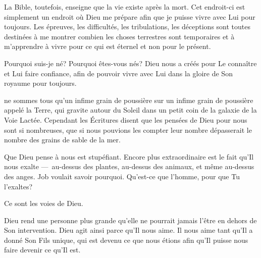 La Bible, toutefois, enseigne que la vie existe après la mort.
 Cet endroit-ci est simplement un endroit où Dieu me prépare
 afin que je puisse vivre avec Lui pour toujours.
 Les épreuves, les difficultés, les tribulations,
 les déceptions sont toutes destinées à me montrer
 combien les choses terrestres sont temporaires
 et à m'apprendre à vivre pour ce qui est éternel et non pour le présent.

Pourquoi suis-je né? Pourquoi êtes-vous nés?
 Dieu nous a créés pour Le connaître et Lui faire confiance,
 afin de pouvoir vivre avec Lui dans la gloire de Son royaume pour toujours. 

\dvrule







 ne sommes tous qu'un infime grain de poussière
 sur un infime grain de poussière appelé la Terre,
 qui gravite autour du Soleil dans un petit coin de la galaxie
 de la Voie Lactée.
 Cependant les Écritures disent que les pensées de Dieu pour nous
 sont si nombreuses, que si nous pouvions les compter
 leur nombre dépasserait le nombre des grains de sable de la mer.

Que Dieu pense à nous est stupéfiant. Encore plus extraordinaire
 est le fait qu'Il nous exalte ---~au-dessus des plantes,
 au-dessus des animaux, et même au-dessus des anges.
 Job voulait savoir pourquoi.
 \og Qu'est-ce que l'homme, pour que Tu l'exaltes? \fg{}

Ce sont les voies de Dieu.


Dieu rend une personne plus grande qu'elle ne pourrait jamais l'être
 en dehors de Son intervention.
 Dieu agit ainsi parce qu'Il nous aime.
 Il nous aime tant qu'Il a donné Son Fils unique,
 qui est devenu ce que nous étions afin qu'Il puisse
 nous faire devenir ce qu'Il est.

